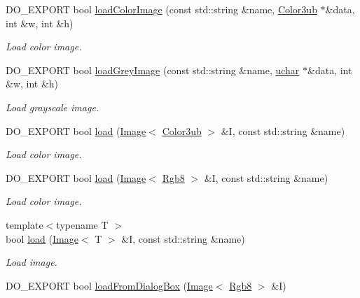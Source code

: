 \begin{DoxyCompactItemize}
D\-O\-\_\-\-E\-X\-P\-O\-R\-T bool \hyperlink{group___image_i_o_gace802b1b4fbf2c8cb73bef0481c03a74}{load\-Color\-Image} (const std\-::string \&name, \hyperlink{group___color_types_ga018b76cd00a4f9dca7dd06246d5bd3aa}{Color3ub} $\ast$\&data, int \&w, int \&h)
\begin{DoxyCompactList}\small\item\em Load color image. \end{DoxyCompactList}\item 
D\-O\-\_\-\-E\-X\-P\-O\-R\-T bool \hyperlink{group___image_i_o_gaeb2394c812f813fd77f1106709b5484d}{load\-Grey\-Image} (const std\-::string \&name, \hyperlink{group___eigen_typedefs_ga65f85814a8290f9797005d3b28e7e5fc}{uchar} $\ast$\&data, int \&w, int \&h)
\begin{DoxyCompactList}\small\item\em Load grayscale image. \end{DoxyCompactList}\item 
D\-O\-\_\-\-E\-X\-P\-O\-R\-T bool \hyperlink{group___image_i_o_ga3f159548cda10d37b3ffcb6edc45d6be}{load} (\hyperlink{class_d_o_1_1_image}{Image}$<$ \hyperlink{group___color_types_ga018b76cd00a4f9dca7dd06246d5bd3aa}{Color3ub} $>$ \&I, const std\-::string \&name)
\begin{DoxyCompactList}\small\item\em Load color image. \end{DoxyCompactList}\item 
D\-O\-\_\-\-E\-X\-P\-O\-R\-T bool \hyperlink{group___image_i_o_ga863c35bb044665359b8c170480f1e98e}{load} (\hyperlink{class_d_o_1_1_image}{Image}$<$ \hyperlink{group___color_types_gabba376766e70e08cdaccf69fa903f526}{Rgb8} $>$ \&I, const std\-::string \&name)
\begin{DoxyCompactList}\small\item\em Load color image. \end{DoxyCompactList}\item 
{\footnotesize template$<$typename T $>$ }\\bool \hyperlink{group___image_i_o_ga55434e11aa6293606de098414d7b5ae4}{load} (\hyperlink{class_d_o_1_1_image}{Image}$<$ T $>$ \&I, const std\-::string \&name)
\begin{DoxyCompactList}\small\item\em Load image. \end{DoxyCompactList}\item 
D\-O\-\_\-\-E\-X\-P\-O\-R\-T bool \hyperlink{group___image_i_o_ga4a26960f04d5aa85afb1883f7fd6956b}{load\-From\-Dialog\-Box} (\hyperlink{class_d_o_1_1_image}{Image}$<$ \hyperlink{group___color_types_gabba376766e70e08cdaccf69fa903f526}{Rgb8} $>$ \&I)

\end{DoxyCompactItemize}
